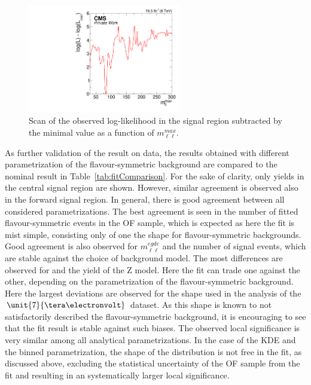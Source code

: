 \begin{figure}[htbp]
\centering
  \includegraphics[width=0.6\textwidth]{plots/results/fit/signal.pdf}
\caption{Scan of the observed log-likelihood in the signal region subtracted by the minimal value as a function of $m_{\ell\ell}^{max}$.}
\label{fig:fit:likelihoodScan}
\end{figure}

As further validation of the result on data, the results obtained with different parametrization of the flavour-symmetric background are compared to the nominal result in Table~\ref{tab:fitComparison}. For the sake of clarity, only yields in the central signal region are shown. However, similar agreement is observed also in the forward signal region. In general, there is good agreement between all considered parametrizations. The best agreement is seen in the number of fitted flavour-symmetric events in the OF sample, which is expected as here the fit is mist simple, consisting only of one the shape for flavour-symmetric backgrounds. Good agreement is also observed for $m_{\ell\ell}^{egde}$ and the number of signal events, which are stable against the choice of background model. The most differences are observed for \Rsfof and the yield of the Z model. Here the fit can trade one against the other, depending on the parametrization of the flavour-symmetric background. Here the largest deviations are observed for the shape used in the analysis of the $\unit{7}{\tera\electronvolt}$ dataset. As this shape is known to not satisfactorily described the flavour-symmetric background, it is encouraging to see that the fit result is stable against such biases. The observed local significance is very similar among all analytical parametrizations. In the case of the KDE and the binned parametrization, the shape of the distribution is not free in the fit, as discussed above, excluding the statistical uncertainty of the OF sample from the fit and resulting in an systematically larger local significance. 


